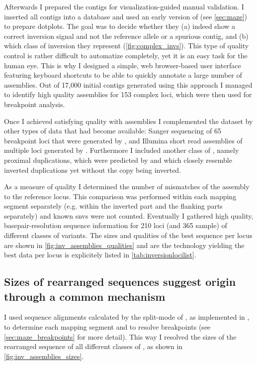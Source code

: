 Afterwards I prepared the contigs for visualization-guided manual validation. I
inserted all contigs into a database and used an early version of \maze (see
\cref{sec:maze}) to prepare dotplots. The goal was to decide whether they (a)
indeed show a correct inversion signal and not the reference allele or a
spurious contig, and (b) which class of inversion they represent
(\cref{fig:complex_invs}). This type of quality control is rather difficult to
automatize completely, yet it is an easy task for the human eye. This is why I
designed a simple, web browser-based user interface featuring keyboard shortcuts
to be able to quickly annotate a large number of assemblies. Out of 17,000
initial contigs generated using this approach I managed to identify high quality
assemblies for 153 complex loci, which were then used for breakpoint analysis.

Once I achieved satisfying quality with \pacbio assemblies I complemented the
dataset by other types of data that had become available: Sanger sequencing of
65 breakpoint loci that were generated by \adrian, and Illumina short read
assemblies of multiple loci generated by \tobias. Furthermore I included another
class of \sv, namely proximal duplications, which were predicted by \tobias and
which closely resemble inverted duplications yet without the copy being
inverted.

As a measure of quality I determined the number of mismatches of the assembly to
the reference locus. This comparison was performed within each mapping segment
separately (e.g. within the inverted part and the flanking parts separately) and
known \acp{snv} were not counted. Eventually I gathered high quality,
basepair-resolution sequence information for 210 loci (and 365 sample) of
different classes of variants. The sizes and qualities of the best sequence per
locus are shown in \cref{fig:inv_assemblies_qualities} and are the technology
yielding the best data per locus is explicitely listed in
\cref{tab:inversionlocilist}.




\subsection{Sizes of rearranged sequences suggest origin through a common mechanism}

I used sequence alignments calculated by the split-mode of \last, as implemented
in \maze, to determine each mapping segment and to resolve breakpoints (see
\cref{sec:maze_breakpoints} for more detail). This way I resolved the sizes of
the rearranged sequence of all different classes of \sv, as shown in
\cref{fig:inv_assemblies_sizes}.

